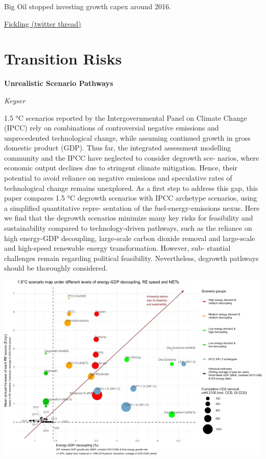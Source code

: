\documentclass[
]{book}
\begin{document}
Big Oil stopped investing growth capex around 2016.

\href{https://twitter.com/davidfickling/status/1394810455655280640}{Fickling (twitter thread)}

\hypertarget{transition-risks}{%
\section{Transition Risks}\label{transition-risks}}

\textbf{Unrealistic Scenario Pathways}

\emph{Keyser}

1.5 °C scenarios reported by the Intergovernmental Panel on Climate Change (IPCC) rely on
combinations of controversial negative emissions and unprecedented technological change,
while assuming continued growth in gross domestic product (GDP). Thus far, the integrated
assessment modelling community and the IPCC have neglected to consider degrowth sce-
narios, where economic output declines due to stringent climate mitigation. Hence, their
potential to avoid reliance on negative emissions and speculative rates of technological
change remains unexplored. As a first step to address this gap, this paper compares 1.5 °C
degrowth scenarios with IPCC archetype scenarios, using a simplified quantitative repre-
sentation of the fuel-energy-emissions nexus. Here we find that the degrowth scenarios
minimize many key risks for feasibility and sustainability compared to technology-driven
pathways, such as the reliance on high energy-GDP decoupling, large-scale carbon dioxide
removal and large-scale and high-speed renewable energy transformation. However, sub-
stantial challenges remain regarding political feasibility. Nevertheless, degrowth pathways
should be thoroughly considered.

\includegraphics{fig/transition_presumptions.png}
\end{document}

